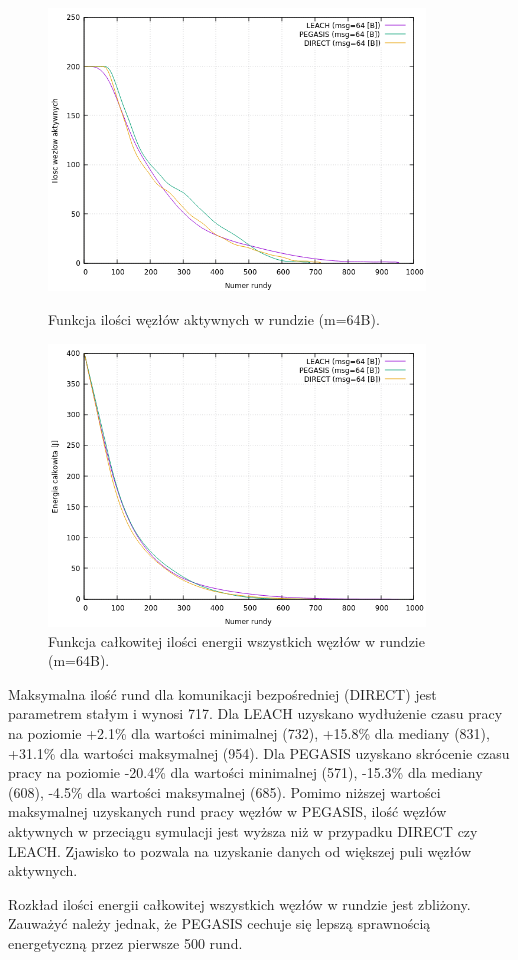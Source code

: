 \documentclass[a4paper,12pt,twoside,openany]{report}
\begin{document}
\begin{figure}[H]
 \centering
 \includegraphics[width=10cm]{images/gnuplot/test_1/nodes_in_round_m64.png}
 \caption{Funkcja ilości węzłów aktywnych w rundzie (m=64B).}
 \includegraphics[width=10cm]{images/gnuplot/test_1/energy_in_round_m64.png}
 \caption{Funkcja całkowitej ilości energii wszystkich węzłów w rundzie (m=64B).}
\end{figure}

\par
Maksymalna ilość rund dla komunikacji bezpośredniej (DIRECT) jest parametrem stałym i wynosi 717.
Dla LEACH uzyskano wydłużenie czasu pracy na poziomie +2.1\% dla wartości minimalnej (732), +15.8\% dla mediany (831), +31.1\% dla wartości maksymalnej (954).
Dla PEGASIS uzyskano skrócenie czasu pracy na poziomie -20.4\% dla wartości minimalnej (571), -15.3\% dla mediany (608), -4.5\% dla wartości maksymalnej (685).
Pomimo niższej wartości maksymalnej uzyskanych rund pracy węzłów w PEGASIS, ilość węzłów aktywnych w przeciągu symulacji jest wyższa niż w przypadku DIRECT czy LEACH.
Zjawisko to pozwala na uzyskanie danych od większej puli węzłów aktywnych.
\par
Rozkład ilości energii całkowitej wszystkich węzłów w rundzie jest zbliżony.
Zauważyć należy jednak, że PEGASIS cechuje się lepszą sprawnością energetyczną przez pierwsze 500 rund. 
\end{document}
